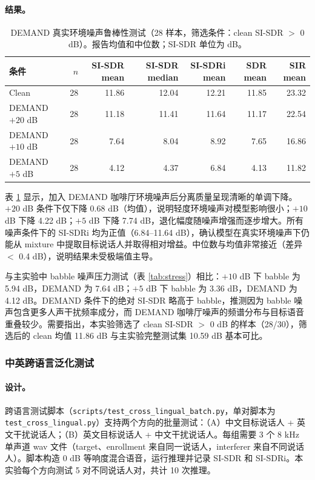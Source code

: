 \documentclass[UTF8,zihao=5,a4paper]{ctexart}
\newcommand{\sisdr}{SI-SDR}
\begin{document}
\paragraph{结果。}

\begin{table}[H]
\centering
\small
\begin{tabular}{lrrrrrr}
\toprule
条件 & $n$ & \sisdr{} mean & \sisdr{} median & \sisdr{}i mean & SDR mean & SIR mean \\
\midrule
Clean & 28 & 11.86 & 12.04 & 12.21 & 11.85 & 23.32 \\
DEMAND $+20$ dB & 28 & 11.18 & 11.41 & 11.64 & 11.17 & 22.54 \\
DEMAND $+10$ dB & 28 & 7.64 & 8.04 & 8.92 & 7.65 & 16.86 \\
DEMAND $+5$ dB & 28 & 4.12 & 4.37 & 6.84 & 4.13 & 11.82 \\
\bottomrule
\end{tabular}
\normalsize
\caption{DEMAND 真实环境噪声鲁棒性测试（28 样本，筛选条件：clean \sisdr{} $>$ 0 dB）。报告均值和中位数；\sisdr{} 单位为 dB。}
\label{tab:noise}
\end{table}

表 \ref{tab:noise} 显示，加入 DEMAND 咖啡厅环境噪声后分离质量呈现清晰的单调下降。$+20$ dB 条件下仅下降 0.68 dB（均值），说明轻度环境噪声对模型影响很小；$+10$ dB 下降 4.22 dB；$+5$ dB 下降 7.74 dB，退化幅度随噪声增强而逐步增大。所有噪声条件下的 \sisdr{}i 均为正值（6.84--11.64 dB），确认模型在真实环境噪声下仍能从 mixture 中提取目标说话人并取得相对增益。中位数与均值非常接近（差异 $<$ 0.4 dB），说明结果未受极端值主导。

与主实验中 babble 噪声压力测试（表 \ref{tab:stress}）相比：$+10$ dB 下 babble 为 5.94 dB，DEMAND 为 7.64 dB；$+5$ dB 下 babble 为 3.36 dB，DEMAND 为 4.12 dB。DEMAND 条件下的绝对 \sisdr{} 略高于 babble，推测因为 babble 噪声包含更多人声干扰频率成分，而 DEMAND 咖啡厅噪声的频谱分布与目标语音重叠较少。需要指出，本实验筛选了 clean \sisdr{} $>$ 0 dB 的样本（28/30），筛选后的 clean 均值 11.86 dB 与主实验完整测试集 10.59 dB 基本可比。

\subsubsection{中英跨语言泛化测试}

\paragraph{设计。}
跨语言测试脚本（\texttt{scripts/test\_cross\_lingual\_batch.py}，单对脚本为 \texttt{test\_cross\_lingual.py}）支持两个方向的批量测试：（A）中文目标说话人 + 英文干扰说话人；（B）英文目标说话人 + 中文干扰说话人。每组需要 3 个 8 kHz 单声道 wav 文件（target、enrollment 来自同一说话人，interferer 来自不同说话人）。脚本构造 0 dB 等响度混合语音，运行推理并记录 \sisdr{} 和 \sisdr{}i。本实验每个方向测试 5 对不同说话人对，共计 10 次推理。
\end{document}

